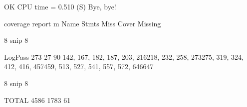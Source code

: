 \documentclass[letterpaper,10pt,english]{sphinxmanual}
\begin{document}
\begin{sphinxVerbatim}[commandchars=\\\{\}]
OK
CPU time =    0.510 (S)
Bye, bye!

\PYGZdl{} coverage report \PYGZhy{}m
Name     Stmts   Miss  Cover   Missing
\PYGZhy{}\PYGZhy{}\PYGZhy{}\PYGZhy{}\PYGZhy{}\PYGZhy{}\PYGZhy{}\PYGZhy{}\PYGZhy{}\PYGZhy{}\PYGZhy{}\PYGZhy{}\PYGZhy{}\PYGZhy{}\PYGZhy{}\PYGZhy{}\PYGZhy{}\PYGZhy{}\PYGZhy{}\PYGZhy{}\PYGZhy{}\PYGZhy{}\PYGZhy{}\PYGZhy{}\PYGZhy{}\PYGZhy{}\PYGZhy{}\PYGZhy{}\PYGZhy{}\PYGZhy{}\PYGZhy{}\PYGZhy{}\PYGZhy{}\PYGZhy{}\PYGZhy{}\PYGZhy{}\PYGZhy{}\PYGZhy{}\PYGZhy{}\PYGZhy{}\PYGZhy{}\PYGZhy{}\PYGZhy{}\PYGZhy{}\PYGZhy{}\PYGZhy{}\PYGZhy{}\PYGZhy{}\PYGZhy{}\PYGZhy{}\PYGZhy{}\PYGZhy{}\PYGZhy{}\PYGZhy{}\PYGZhy{}\PYGZhy{}\PYGZhy{}\PYGZhy{}\PYGZhy{}\PYGZhy{}\PYGZhy{}\PYGZhy{}\PYGZhy{}\PYGZhy{}\PYGZhy{}\PYGZhy{}\PYGZhy{}\PYGZhy{}\PYGZhy{}\PYGZhy{}\PYGZhy{}\PYGZhy{}\PYGZhy{}\PYGZhy{}\PYGZhy{}\PYGZhy{}\PYGZhy{}\PYGZhy{}\PYGZhy{}\PYGZhy{}\PYGZhy{}\PYGZhy{}\PYGZhy{}\PYGZhy{}\PYGZhy{}\PYGZhy{}\PYGZhy{}\PYGZhy{}\PYGZhy{}\PYGZhy{}\PYGZhy{}\PYGZhy{}\PYGZhy{}\PYGZhy{}\PYGZhy{}\PYGZhy{}\PYGZhy{}\PYGZhy{}\PYGZhy{}\PYGZhy{}\PYGZhy{}\PYGZhy{}\PYGZhy{}\PYGZhy{}\PYGZhy{}\PYGZhy{}

8\PYGZlt{}\PYGZhy{}\PYGZhy{}\PYGZhy{}\PYGZhy{}\PYGZhy{}\PYGZhy{}\PYGZhy{}\PYGZhy{}\PYGZhy{}\PYGZhy{}\PYGZhy{}\PYGZhy{}\PYGZhy{}\PYGZhy{} snip \PYGZhy{}\PYGZhy{}\PYGZhy{}\PYGZhy{}\PYGZhy{}\PYGZhy{}\PYGZhy{}\PYGZhy{}\PYGZhy{}\PYGZhy{}\PYGZhy{}\PYGZhy{}\PYGZhy{}\PYGZhy{}\PYGZhy{}\PYGZhy{}\PYGZhy{}\PYGZhy{}\PYGZgt{}8

LogPass    273     27    90\PYGZpc{}   142, 167, 182, 187, 203, 216\PYGZhy{}218, 232, 258, 273\PYGZhy{}275, 319, 324, 412, 416, 457\PYGZhy{}459, 513, 527, 541, 557, 572, 646\PYGZhy{}647

8\PYGZlt{}\PYGZhy{}\PYGZhy{}\PYGZhy{}\PYGZhy{}\PYGZhy{}\PYGZhy{}\PYGZhy{}\PYGZhy{}\PYGZhy{}\PYGZhy{}\PYGZhy{}\PYGZhy{}\PYGZhy{}\PYGZhy{} snip \PYGZhy{}\PYGZhy{}\PYGZhy{}\PYGZhy{}\PYGZhy{}\PYGZhy{}\PYGZhy{}\PYGZhy{}\PYGZhy{}\PYGZhy{}\PYGZhy{}\PYGZhy{}\PYGZhy{}\PYGZhy{}\PYGZhy{}\PYGZhy{}\PYGZhy{}\PYGZhy{}\PYGZgt{}8

\PYGZhy{}\PYGZhy{}\PYGZhy{}\PYGZhy{}\PYGZhy{}\PYGZhy{}\PYGZhy{}\PYGZhy{}\PYGZhy{}\PYGZhy{}\PYGZhy{}\PYGZhy{}\PYGZhy{}\PYGZhy{}\PYGZhy{}\PYGZhy{}\PYGZhy{}\PYGZhy{}\PYGZhy{}\PYGZhy{}\PYGZhy{}\PYGZhy{}\PYGZhy{}\PYGZhy{}\PYGZhy{}\PYGZhy{}\PYGZhy{}\PYGZhy{}\PYGZhy{}\PYGZhy{}\PYGZhy{}\PYGZhy{}\PYGZhy{}\PYGZhy{}\PYGZhy{}\PYGZhy{}\PYGZhy{}\PYGZhy{}\PYGZhy{}\PYGZhy{}\PYGZhy{}\PYGZhy{}\PYGZhy{}\PYGZhy{}\PYGZhy{}\PYGZhy{}\PYGZhy{}\PYGZhy{}\PYGZhy{}\PYGZhy{}\PYGZhy{}\PYGZhy{}\PYGZhy{}\PYGZhy{}\PYGZhy{}\PYGZhy{}\PYGZhy{}\PYGZhy{}\PYGZhy{}\PYGZhy{}\PYGZhy{}\PYGZhy{}\PYGZhy{}\PYGZhy{}\PYGZhy{}\PYGZhy{}\PYGZhy{}\PYGZhy{}\PYGZhy{}\PYGZhy{}\PYGZhy{}\PYGZhy{}\PYGZhy{}\PYGZhy{}\PYGZhy{}\PYGZhy{}\PYGZhy{}\PYGZhy{}\PYGZhy{}\PYGZhy{}\PYGZhy{}\PYGZhy{}\PYGZhy{}\PYGZhy{}\PYGZhy{}\PYGZhy{}\PYGZhy{}\PYGZhy{}\PYGZhy{}\PYGZhy{}\PYGZhy{}\PYGZhy{}\PYGZhy{}\PYGZhy{}\PYGZhy{}\PYGZhy{}\PYGZhy{}\PYGZhy{}\PYGZhy{}\PYGZhy{}\PYGZhy{}\PYGZhy{}\PYGZhy{}\PYGZhy{}\PYGZhy{}\PYGZhy{}
TOTAL     4586   1783    61\PYGZpc{}
\end{sphinxVerbatim}
\end{document}
